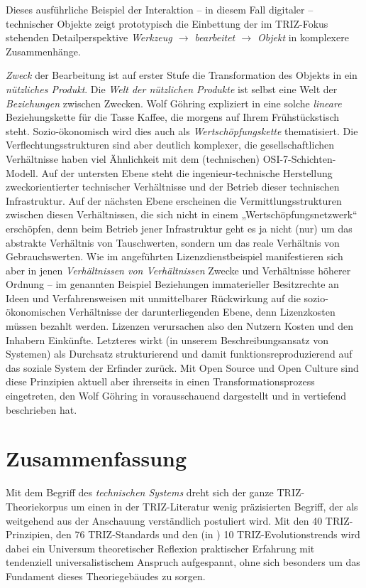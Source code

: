 \documentclass[11pt,a4paper]{article}
\begin{document}
Dieses ausführliche Beispiel der Interaktion -- in diesem Fall digitaler --
technischer Objekte zeigt prototypisch die Einbettung der im TRIZ-Fokus
stehenden Detailperspektive \emph{Werkzeug $\to$ bearbeitet $\to$ Objekt} in
komplexere Zusammenhänge.

\emph{Zweck} der Bearbeitung ist auf erster Stufe die Transformation des
Objekts in ein \emph{nützliches Produkt}. Die \emph{Welt der nützlichen
  Produkte} ist selbst eine Welt der \emph{Beziehungen} zwischen Zwecken.
Wolf Göhring expliziert in \cite{Goehring1999} eine solche \emph{lineare}
Beziehungskette für die Tasse Kaffee, die morgens auf Ihrem Frühstückstisch
steht. Sozio-ökonomisch wird dies auch als \emph{Wertschöpfungskette}
thematisiert. Die Verflechtungsstrukturen sind aber deutlich komplexer, die
gesellschaftlichen Verhältnisse haben viel Ähnlichkeit mit dem (technischen)
OSI-7-Schichten-Modell. Auf der untersten Ebene steht die ingenieur-technische
Herstellung zweckorientierter technischer Verhältnisse und der Betrieb dieser
technischen Infrastruktur.  Auf der nächsten Ebene erscheinen die
Vermittlungsstrukturen zwischen diesen Verhältnissen, die sich nicht in einem
„Wertschöpfungsnetzwerk“ erschöpfen, denn beim Betrieb jener Infrastruktur
geht es ja nicht (nur) um das abstrakte Verhältnis von Tauschwerten, sondern
um das reale Verhältnis von Gebrauchswerten.  Wie im angeführten
Lizenzdienstbeispiel manifestieren sich aber in jenen \emph{Verhältnissen von
  Verhältnissen} Zwecke und Verhältnisse höherer Ordnung -- im genannten
Beispiel Beziehungen immaterieller Besitzrechte an Ideen und Verfahrensweisen
mit unmittelbarer Rückwirkung auf die sozio-ökonomischen Verhältnisse der
darunterliegenden Ebene, denn Lizenzkosten müssen bezahlt werden.  Lizenzen
verursachen also den Nutzern Kosten und den Inhabern Einkünfte. Letzteres
wirkt (in unserem Beschreibungsansatz von Systemen) als Durchsatz
strukturierend und damit funktionsreproduzierend auf das soziale System der
Erfinder zurück. Mit Open Source und Open Culture sind diese Prinzipien
aktuell aber ihrerseits in einen Transformationsprozess eingetreten, den Wolf
Göhring in \cite{Goehring1999} vorausschauend dargestellt und in
\cite{Goehring2007} vertiefend beschrieben hat.

\section{Zusammenfassung}

Mit dem Begriff des \emph{technischen Systems} dreht sich der ganze
TRIZ-Theoriekorpus um einen in der TRIZ-Literatur wenig präzisierten Begriff,
der als weitgehend aus der Anschauung verständlich postuliert wird. Mit den 40
TRIZ-Prinzipien, den 76 TRIZ-Standards und den (in \cite{TESE2018}) 10
TRIZ-Evolutionstrends wird dabei ein Universum theoretischer Reflexion
praktischer Erfahrung mit tendenziell universalistischem Anspruch aufgespannt,
ohne sich besonders um das Fundament dieses Theoriegebäudes zu sorgen. 
\end{document}
